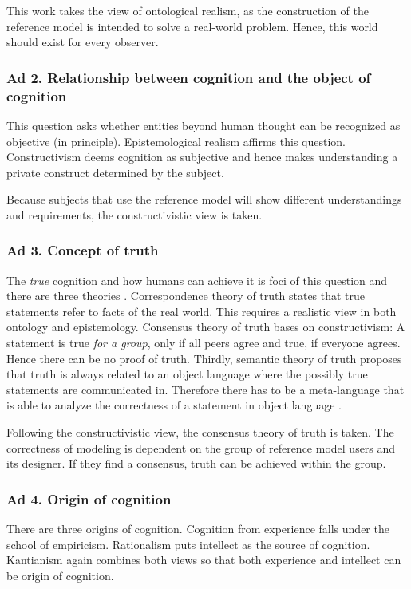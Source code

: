 This work takes the view of ontological realism, as the construction of the reference model is intended to solve a real-world problem. Hence, this world should exist for every observer. 

\subsubsection{Ad 2. Relationship between cognition and the object of cognition}
This question asks whether entities beyond human thought can be recognized as objective (in principle). Epistemological realism affirms this question. Constructivism deems cognition as subjective and hence makes understanding a private construct determined by the subject. 

Because subjects that use the reference model will show different understandings and requirements, the constructivistic view is taken. 

\subsubsection{Ad 3. Concept of truth}
The \textit{true} cognition and how humans can achieve it is foci of this question and there are three theories \cite{habermas1973}. Correspondence theory of truth states that true statements refer to facts of the real world. This requires a realistic view in both ontology and epistemology. Consensus theory of truth bases on constructivism: A statement is true\textit{ for a group}, only if all peers agree and true, if everyone agrees. Hence there can be no proof of truth. Thirdly, semantic theory of truth proposes that truth is always related to an object language where the possibly true statements are communicated in. Therefore there has to be a meta-language that is able to analyze the correctness of a statement in object language \citep{tarski1944}. 

Following the constructivistic view, the consensus theory of truth is taken. The correctness of modeling is dependent on the group of reference model users and its designer. If they find a consensus, truth can be achieved within the group. 

\subsubsection{Ad 4. Origin of cognition}
There are three origins of cognition. Cognition from experience falls under the school of empiricism. Rationalism puts intellect as the source of cognition. Kantianism again combines both views so that both experience and intellect can be origin of cognition. 

